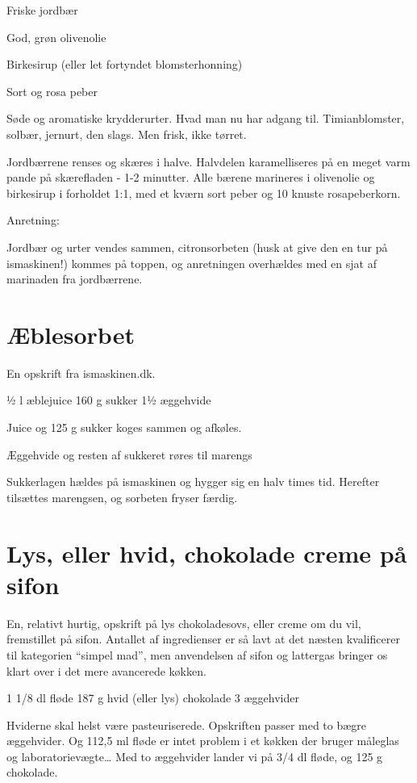 \documentclass[
]{book}
\begin{document}
Friske jordbær

God, grøn olivenolie

Birkesirup (eller let fortyndet blomsterhonning)

Sort og rosa peber

Søde og aromatiske krydderurter. Hvad man nu har adgang til. Timianblomster, solbær, jernurt, den slags. Men frisk, ikke tørret.

Jordbærrene renses og skæres i halve. Halvdelen karamelliseres på en meget varm pande på skærefladen - 1-2 minutter. Alle bærene marineres i olivenolie og birkesirup i forholdet 1:1, med et kværn sort peber og 10 knuste rosapeberkorn.

Anretning:

Jordbær og urter vendes sammen, citronsorbeten (husk at give den en tur på ismaskinen!) kommes på toppen, og anretningen overhældes med en sjat af marinaden fra jordbærrene.

\hypertarget{uxe6blesorbet}{%
\section{Æblesorbet}\label{uxe6blesorbet}}

En opskrift fra ismaskinen.dk.

½ l æblejuice
160 g sukker
1½ æggehvide

Juice og 125 g sukker koges sammen og afkøles.~

Æggehvide og resten af sukkeret røres til marengs

Sukkerlagen hældes på ismaskinen og hygger sig en halv times tid. Herefter tilsættes marengsen, og sorbeten fryser færdig.

\hypertarget{lys-eller-hvid-chokolade-creme-puxe5-sifon}{%
\section{Lys, eller hvid, chokolade creme på sifon}\label{lys-eller-hvid-chokolade-creme-puxe5-sifon}}

En, relativt hurtig, opskrift på lys chokoladesovs, eller creme om du vil, fremstillet på sifon. Antallet af ingredienser er så lavt at det næsten kvalificerer til kategorien ``simpel mad'', men anvendelsen af sifon og lattergas bringer os klart over i det mere avancerede køkken.

1 1/8 dl fløde
187 g hvid (eller lys) chokolade
3 æggehvider

Hviderne skal helst være pasteuriserede. Opskriften passer med to bægre æggehvider. Og 112,5 ml fløde er intet problem i et køkken der bruger måleglas og laboratorievægte\ldots{} Med to æggehvider lander vi på 3/4 dl fløde, og 125 g chokolade.
\end{document}
